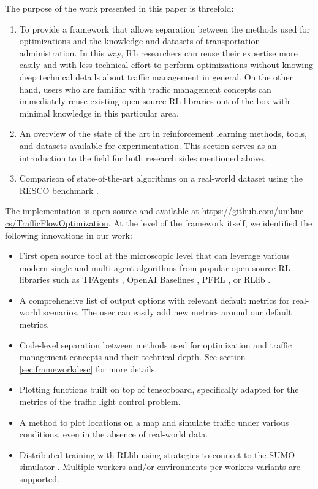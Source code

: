 \documentclass[a4paper,twoside]{article}
\begin{document}
The purpose of the work presented in this paper is threefold:
\begin{enumerate}
	\item To provide a framework that allows separation between the methods used for optimizations and the knowledge and datasets of transportation administration. In this way, RL researchers can reuse their expertise more easily and with less technical effort to perform optimizations without knowing deep technical details about traffic management in general. On the other hand, users who are familiar with traffic management concepts can immediately reuse existing open source RL libraries out of the box with minimal knowledge in this particular area.
	\item An overview of the state of the art in reinforcement learning methods, tools, and datasets available for experimentation. This section serves as an introduction to the field for both research sides mentioned above.
	\item Comparison of state-of-the-art algorithms on a real-world dataset using the RESCO benchmark \cite{ault2021reinforcement}.
\end{enumerate}

The implementation is open source and available at \url{https://github.com/unibuc-cs/TrafficFlowOptimization}.
At the level of the framework itself, we identified the following innovations in our work:
\begin{itemize}
	\item First open source tool at the microscopic level that can leverage various modern single and multi-agent algorithms from popular open source RL libraries such as TFAgents \cite{TFAgents}, OpenAI Baselines \cite{baselines}, PFRL \cite{PFRL}, or RLlib \cite{liang2018rllib}.
	\item A comprehensive list of output options with relevant default metrics for real-world scenarios. The user can easily add new metrics around our default metrics.
	\item Code-level separation between methods used for optimization and traffic management concepts and their technical depth. See section \ref{sec:frameworkdesc} for more details.
	\item Plotting functions built on top of tensorboard, specifically adapted for the metrics of the traffic light control problem.
	\item A method to plot locations on a map and simulate traffic under various conditions, even in the absence of real-world data.
	\item Distributed training with RLlib using strategies to connect to the SUMO simulator \cite{SUMMO}. Multiple workers and/or environments per workers variants are supported.
\end{itemize}
\end{document}
